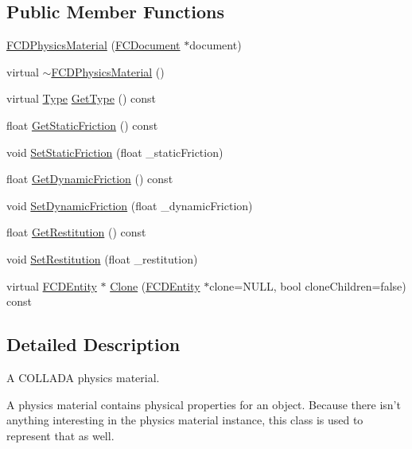 \subsection*{Public Member Functions}
\begin{DoxyCompactItemize}
\item 
\hyperlink{classFCDPhysicsMaterial_af117b2799b8342635e0b0778e496e577}{FCDPhysicsMaterial} (\hyperlink{classFCDocument}{FCDocument} $\ast$document)
\item 
virtual \hyperlink{classFCDPhysicsMaterial_a8c125b5616a838df37f2130501dce9d2}{$\sim$FCDPhysicsMaterial} ()
\item 
virtual \hyperlink{classFCDEntity_a9301a4bd5f4d4190ec13e40db4effdd7}{Type} \hyperlink{classFCDPhysicsMaterial_af7b84458b75d65c2e88028cafb865526}{GetType} () const 
\item 
float \hyperlink{classFCDPhysicsMaterial_adf3cae3fa4dc196807c446530701f482}{GetStaticFriction} () const 
\item 
void \hyperlink{classFCDPhysicsMaterial_ad89f828ca130c56e54f00f97384d492a}{SetStaticFriction} (float \_\-staticFriction)
\item 
float \hyperlink{classFCDPhysicsMaterial_aefdc9cbe348ec8dec6cc2a427740cf6a}{GetDynamicFriction} () const 
\item 
void \hyperlink{classFCDPhysicsMaterial_a6270ec2550be3c522488263908ce8ed3}{SetDynamicFriction} (float \_\-dynamicFriction)
\item 
float \hyperlink{classFCDPhysicsMaterial_a9cede0114b06eb9fab75f98de2e821c1}{GetRestitution} () const 
\item 
void \hyperlink{classFCDPhysicsMaterial_a39d172917abbce73b84f194ee7721eaf}{SetRestitution} (float \_\-restitution)
\item 
virtual \hyperlink{classFCDEntity}{FCDEntity} $\ast$ \hyperlink{classFCDPhysicsMaterial_a37db393d57f224a97e24ee6f5d4c4499}{Clone} (\hyperlink{classFCDEntity}{FCDEntity} $\ast$clone=NULL, bool cloneChildren=false) const 
\end{DoxyCompactItemize}


\subsection{Detailed Description}
A COLLADA physics material.

A physics material contains physical properties for an object. Because there isn't anything interesting in the physics material instance, this class is used to represent that as well. 

